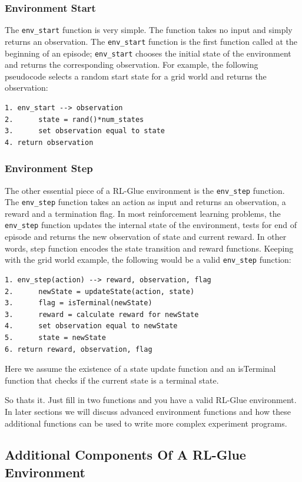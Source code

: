\documentclass[11pt]{article}
\begin{document}
\subsubsection{Environment Start}
The \texttt{env\_start} function is very simple. The function takes no input and simply returns an observation. The \texttt{env\_start} function is the first function called at the beginning of an episode; \texttt{env\_start} chooses the initial state of the environment and returns the corresponding observation. For example, the following pseudocode selects a random start state for a grid world and returns the observation:
\begin{verbatim}
1. env_start --> observation
2.      state = rand()*num_states
3.      set observation equal to state
4. return observation
\end{verbatim}


\subsubsection{Environment Step}
The other essential piece of a RL-Glue environment is the \texttt{env\_step} function. The \texttt{env\_step} function takes an action as input and returns an observation, a reward and a termination flag. In most reinforcement learning problems, the  \texttt{env\_step} function updates the internal state of the environment, tests for end of episode and returns the new observation of state and current reward. In other words, step function encodes the state transition and reward functions. Keeping with the grid world example, the following would be a valid \texttt{env\_step} function:
\begin{verbatim}
1. env_step(action) --> reward, observation, flag 
2.      newState = updateState(action, state)
3.      flag = isTerminal(newState)
3.      reward = calculate reward for newState
4.      set observation equal to newState
5.      state = newState
6. return reward, observation, flag
\end{verbatim}
Here we assume the existence of a state update function and an isTerminal function that checks if the current state is a terminal state.

So thats it. Just fill in two functions and you have a valid RL-Glue environment. In later sections we will discuss advanced environment functions and how these additional functions can be used to write more complex experiment programs. 

\subsection{Additional Components Of A RL-Glue Environment}
\label{envp2}
\end{document}
